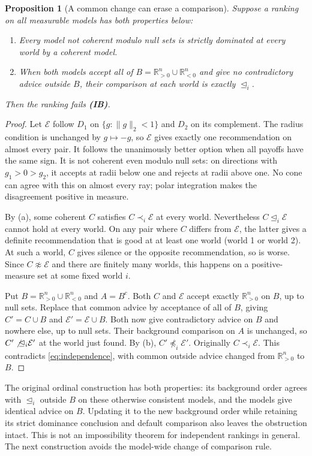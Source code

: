 \documentclass[11pt]{article}
\newtheorem{proposition}[theorem]{Proposition}
\theoremstyle{remark}
\newcommand{\R}{\mathbb R}
\newcommand{\Escr}{\mathcal E}
\begin{document}
\begin{proposition}[A common change can erase a comparison]\label{prop:obstruction}
Suppose a ranking on all measurable models has both properties below:
\begin{enumerate}[label=(\alph*)]
\item Every model not coherent modulo null sets is strictly dominated at
every world by a coherent model.
\item When both models accept all of $B=\R^n_{>0}\cup\R^n_{<0}$ and give
no contradictory advice outside $B$, their comparison at each world is exactly
$\unlhd_i$.
\end{enumerate}
Then the ranking fails \textbf{(IB)}.
\end{proposition}
\begin{proof}
Let $\Escr$ follow $D_1$ on $\{g:\|g\|_2<1\}$ and $D_2$ on its complement.
The radius condition is unchanged by $g\mapsto-g$, so $\Escr$ gives exactly
one recommendation on almost every pair. It follows the unanimously better
option when all payoffs have the same sign. It is not coherent even modulo
null sets: on directions with $g_1>0>g_2$, it accepts at radii below one and
rejects at radii above one. No cone can agree with this on almost every ray;
polar integration makes the disagreement positive in measure.

By (a), some coherent $C$ satisfies $C\prec_i\Escr$ at every world.
Nevertheless $C\unlhd_i\Escr$ cannot hold at every world. On any pair where
$C$ differs from $\Escr$, the latter gives a definite recommendation that is
good at at least one world (world 1 or world 2). At such a world, $C$ gives
silence or the opposite recommendation, so is worse. Since $C\not\approx\Escr$
and there are finitely many worlds, this happens on a positive-measure set
at some fixed world $i$.

Put $B=\R^n_{>0}\cup\R^n_{<0}$ and $A=B^c$. Both $C$ and $\Escr$ accept
exactly $\R^n_{>0}$ on $B$, up to null sets. Replace that common advice by
acceptance of all of $B$, giving $C'=C\cup B$ and $\Escr'=\Escr\cup B$.
Both now give contradictory advice on $B$ and nowhere else, up to null sets.
Their background comparison on
$A$ is unchanged, so $C'\not\unlhd_i\Escr'$ at the world just found. By (b),
$C'\not\preceq_i\Escr'$. Originally $C\prec_i\Escr$. This contradicts
\eqref{eq:independence}, with common outside advice changed from
$\R^n_{>0}$ to $B$.
\end{proof}

The original ordinal construction has both properties: its background order
agrees with $\unlhd_i$ outside $B$ on these otherwise consistent models, and
the models give identical advice on $B$. Updating it to the new background
order while retaining its strict dominance conclusion and default comparison
also leaves the obstruction intact.
This is not an impossibility theorem for independent rankings in general.
The next construction avoids the model-wide change of comparison rule.
\end{document}
